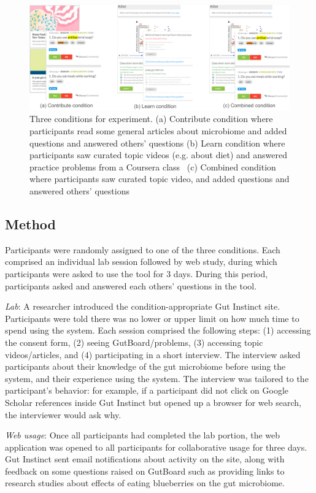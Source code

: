\begin{figure}[h]
  \centering
  \includegraphics[width=1.0\textwidth]{figures/gutinstinct/gi-6.png}
  \caption[Three conditions for experiment]
{Three conditions for experiment. (a) Contribute condition where participants read some general articles about microbiome and added questions and answered others’ questions (b) Learn condition where participants saw curated topic videos (e.g. about diet) and answered practice problems from a Coursera class~\cite{Knight2016} (c) Combined condition where participants saw curated topic video, and added questions and answered others’ questions }
  \label{fig:gi-6}
\end{figure}

\subsection*{Method}
Participants were randomly assigned to one of the three conditions. Each comprised an individual lab session followed by web study, during which participants were asked to use the tool for 3 days. During this period, participants asked and answered each others’ questions in the tool.

\textit{Lab}: A researcher introduced the condition-appropriate Gut Instinct site. Participants were told there was no lower or upper limit on how much time to spend using the system. Each session comprised the following steps: (1) accessing the consent form, (2) seeing GutBoard/problems, (3) accessing topic videos/articles, and (4) participating in a short interview. The interview asked participants about their knowledge of the gut microbiome before using the system, and their experience using the system. The interview was tailored to the participant’s behavior: for example, if a participant did not click on Google Scholar references inside Gut Instinct but opened up a browser for web search, the interviewer would ask why.
 
\textit{Web usage}: Once all participants had completed the lab portion, the web application was opened to all participants for collaborative usage for three days. Gut Instinct sent email notifications about activity on the site, along with feedback on some questions raised on GutBoard such as providing links to research studies about effects of eating blueberries on the gut microbiome. 

